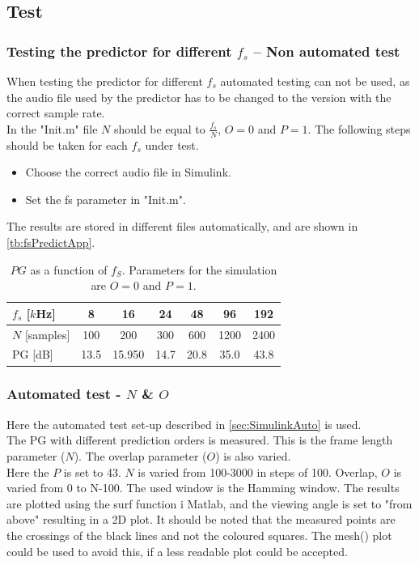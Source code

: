 \subsection{Test}

\subsubsection{Testing the predictor for different $f_s$ -- Non automated test}
When testing the predictor for different $f_s$ automated testing can not be used, as the audio file used by the predictor has to be changed to the version with the correct sample rate. \\ 
In the "Init.m" file $N$ should be equal to $\frac{f_s}{N}$, $O=0$ and $P=1$. The following steps should be taken for each $f_s$ under test.
\begin{itemize}
	\item Choose the correct audio file in Simulink. 
	\item Set the fs parameter in "Init.m". 
\end{itemize}
The results are stored in different files automatically, and are shown in \autoref{tb:fsPredictApp}.

\begin{table}[H]
\centering
\begin{tabular}{|l|c|c|c|c|c|c|}
	\hline
	$f_s$ {[}$k$Hz{]} & 8 & 16 & 24 & 48 & 96 & 192 \\ \hline 
	$N$ {[}samples{]} & 100 & 200 & 300 & 600 & 1200 & 2400 \\ \hline 
	PG {[}dB{]} & 13.5 & 15.950 & 14.7 & 20.8 & 35.0 & 43.8 \\ \hline
\end{tabular}
\caption{$PG$ as a function of $f_S$. Parameters for the simulation are $O=0$ and $P=1$.}
\label{tb:fsPredictApp}
\end{table}  
 
\subsubsection{Automated test - $N$ \& $O$}
Here the automated test set-up described in \autoref{sec:SimulinkAuto} is used.\\ 
The PG with different prediction orders is measured. This is the frame length parameter ($N$). The overlap parameter ($O$) is also varied. \\ 
Here the $P$ is set to 43. $N$ is varied from 100-3000 in steps of 100. Overlap, $O$ is varied from 0 to N-100. The used window is the Hamming window. The results are plotted using the surf function i Matlab, and the viewing angle is set to "from above" resulting in a 2D plot. It should be noted that the measured points are the crossings of the black lines and not the coloured squares. The mesh() plot could be used to avoid this, if a less readable plot could be accepted. 

